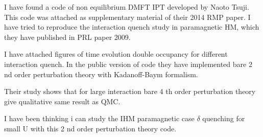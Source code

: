 I have found a code of non equilibrium DMFT IPT developed by Naoto Tsuji. This code was attached as supplementary material of their 2014 RMP paper. I have tried to reproduce the interaction quench study in paramagnetic HM, which they have published in PRL \cite{HUB_para} paper 2009.

 I have attached  figures of time evolution  double occupancy for different interaction quench.   In the public version of code they have implemented bare 2 nd order perturbation theory with Kadanoff-Baym formalism.

Their study shows that for large interaction  bare 4 th order perturbation theory give qualitative same result as QMC.

I have been thinking i can study the IHM paramagnetic case $\delta$ quenching for small U with this 2 nd order perturbation theory code.

\begin{figure}[H]
  \caption{}
\end{figure}

